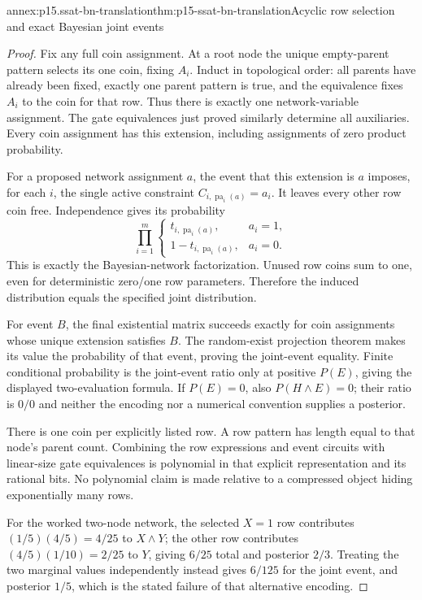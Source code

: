 \begin{annexitem}{annex:p15.ssat-bn-translation}{thm:p15-ssat-bn-translation}{Acyclic row selection and exact Bayesian joint events}
\begin{proof}
Fix any full coin assignment. At a root node the unique empty-parent
pattern selects its one coin, fixing \(A_i\). Induct in topological
order: all parents have already been fixed, exactly one parent pattern
is true, and the equivalence fixes \(A_i\) to the coin for that row.
Thus there is exactly one network-variable assignment. The gate
equivalences just proved similarly determine all auxiliaries. Every
coin assignment has this extension, including assignments of zero
product probability.

For a proposed network assignment \(a\), the event that this
extension is \(a\) imposes, for each \(i\), the single active
constraint \(C_{i,\operatorname{pa}_i(a)}=a_i\). It leaves every
other row coin free. Independence gives its probability
\[
 \prod_{i=1}^m
 \begin{cases}
 t_{i,\operatorname{pa}_i(a)},&a_i=1,\\
 1-t_{i,\operatorname{pa}_i(a)},&a_i=0.
 \end{cases}
\]
This is exactly the Bayesian-network factorization. Unused row coins
sum to one, even for deterministic zero/one row parameters. Therefore
the induced distribution equals the specified joint distribution.

For event \(B\), the final existential matrix succeeds exactly for
coin assignments whose unique extension satisfies \(B\). The
random-exist projection theorem makes its value the probability of that
event, proving the joint-event equality. Finite conditional probability
is the joint-event ratio only at positive \(P(E)\), giving the
displayed two-evaluation formula. If \(P(E)=0\), also
\(P(H\land E)=0\); their ratio is \(0/0\) and neither the
encoding nor a numerical convention supplies a posterior.

There is one coin per explicitly listed row. A row pattern has length
equal to that node's parent count. Combining the row expressions and
event circuits with linear-size gate equivalences is polynomial in
that explicit representation and its rational bits. No polynomial
claim is made relative to a compressed object hiding exponentially
many rows.

For the worked two-node network, the selected \(X=1\) row contributes
\((1/5)(4/5)=4/25\) to \(X\land Y\); the other row contributes
\((4/5)(1/10)=2/25\) to \(Y\), giving \(6/25\) total and
posterior \(2/3\). Treating the two marginal values independently
instead gives \(6/125\) for the joint event, and posterior \(1/5\),
which is the stated failure of that alternative encoding.
\end{proof}
\end{annexitem}


